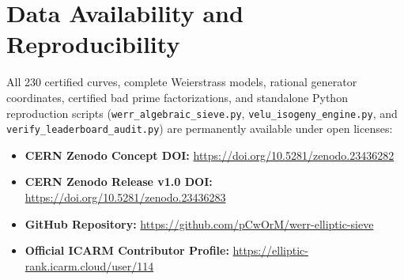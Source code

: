 \documentclass[10pt,a4paper]{article}
\theoremstyle{plain}
\theoremstyle{definition}
\theoremstyle{remark}
\begin{document}
\section*{Data Availability and Reproducibility}

All 230 certified curves, complete Weierstrass models, rational generator coordinates, certified bad prime factorizations, and standalone Python reproduction scripts (\texttt{werr\_algebraic\_sieve.py}, \texttt{velu\_isogeny\_engine.py}, and \texttt{verify\_leaderboard\_audit.py}) are permanently available under open licenses:
\begin{itemize}[leftmargin=2em,noitemsep]
    \item \textbf{CERN Zenodo Concept DOI:} \url{https://doi.org/10.5281/zenodo.23436282}
    \item \textbf{CERN Zenodo Release v1.0 DOI:} \url{https://doi.org/10.5281/zenodo.23436283}
    \item \textbf{GitHub Repository:} \url{https://github.com/pCwOrM/werr-elliptic-sieve}
    \item \textbf{Official ICARM Contributor Profile:} \url{https://elliptic-rank.icarm.cloud/user/114}
\end{itemize}
\end{document}
